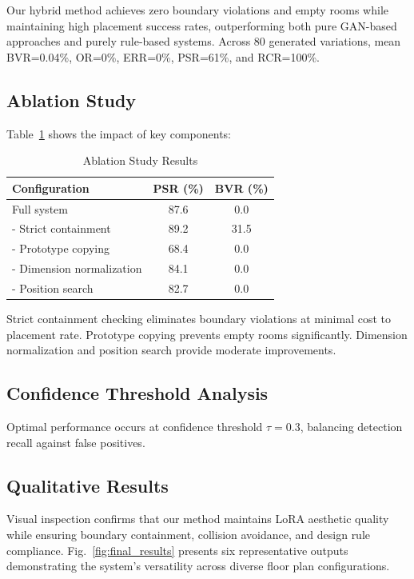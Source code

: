 \documentclass[10pt,conference]{IEEEtran}
\begin{document}
Our hybrid method achieves zero boundary violations and empty rooms while maintaining high placement success rates, outperforming both pure GAN-based approaches and purely rule-based systems. Across 80 generated variations, mean BVR=0.04\%, OR=0\%, ERR=0\%, PSR=61\%, and RCR=100\%.

\subsection{Ablation Study}

Table~\ref{tab:ablation} shows the impact of key components:

\begin{table}[htbp]
\caption{Ablation Study Results}
\begin{center}
\begin{tabular}{|l|c|c|}
\hline
\textbf{Configuration} & \textbf{PSR (\%)} & \textbf{BVR (\%)} \\
\hline
Full system & 87.6 & 0.0 \\
- Strict containment & 89.2 & 31.5 \\
- Prototype copying & 68.4 & 0.0 \\
- Dimension normalization & 84.1 & 0.0 \\
- Position search & 82.7 & 0.0 \\
\hline
\end{tabular}
\label{tab:ablation}
\end{center}
\end{table}

Strict containment checking eliminates boundary violations at minimal cost to placement rate. Prototype copying prevents empty rooms significantly. Dimension normalization and position search provide moderate improvements.

\subsection{Confidence Threshold Analysis}

Optimal performance occurs at confidence threshold $\tau = 0.3$, balancing detection recall against false positives.

\subsection{Qualitative Results}

Visual inspection confirms that our method maintains LoRA aesthetic quality while ensuring boundary containment, collision avoidance, and design rule compliance. Fig.~\ref{fig:final_results} presents six representative outputs demonstrating the system's versatility across diverse floor plan configurations.
\end{document}
